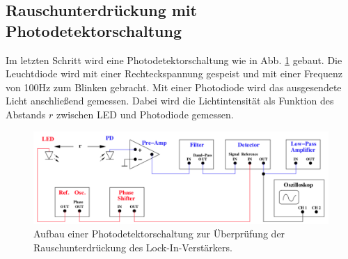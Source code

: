 \subsection{Rauschunterdrückung mit Photodetektorschaltung} %
Im letzten Schritt wird eine Photodetektorschaltung wie in Abb. \ref{lockin3} gebaut.
Die Leuchtdiode wird mit einer Rechteckspannung gespeist und mit einer Frequenz von 100Hz zum Blinken gebracht.
Mit einer Photodiode wird das ausgesendete Licht anschließend gemessen.
Dabei wird die Lichtintensität als Funktion des Abstands $r$ zwischen LED und Photodiode gemessen.
\begin{figure}
    \centering
    \includegraphics{build/lockin3.png}
    \caption{Aufbau einer Photodetektorschaltung zur Überprüfung der
    Rauschunterdrückung des Lock-In-Verstärkers.}
    \label{lockin3}
\end{figure}


